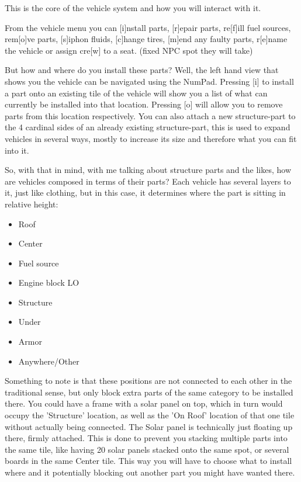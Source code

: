 This is the core of the vehicle system and how you will interact with it.

From the vehicle menu you can [i]nstall parts, [r]epair parts, re[f]ill fuel sources, rem[o]ve parts, [s]iphon fluids, [c]hange tires, [m]end any faulty parts, r[e]name the vehicle or assign cre[w] to a seat. (fixed NPC spot they will take)

But how and where do you install these parts? Well, the left hand view that shows you the vehicle can be navigated using the NumPad. Pressing [i] to install a part onto an existing tile of the vehicle will show you a list of what can currently be installed into that location. Pressing [o] will allow you to remove parts from this location respectively. You can also attach a new structure-part to the 4 cardinal sides of an already existing structure-part, this is used to expand vehicles in several ways, mostly to increase its size and therefore what you can fit into it.

So, with that in mind, with me talking about structure parts and the likes, how are vehicles composed in terms of their parts? Each vehicle has several layers to it, just like clothing, but in this case, it determines where the part is sitting in relative height:

\begin{itemize}
\item Roof
\item Center
\item Fuel source
\item Engine block LO
\item Structure
\item Under
\item Armor
\item Anywhere/Other
\end{itemize}

Something to note is that these positions are not connected to each other in the traditional sense, but only block extra parts of the same category to be installed there. You could have a frame with a solar panel on top, which in turn would occupy the 'Structure' location, as well as the 'On Roof' location of that one tile without actually being connected. The Solar panel is technically just floating up there, firmly attached. This is done to prevent you stacking multiple parts into the same tile, like having 20 solar panels stacked onto the same spot, or several boards in the same Center tile. This way you will have to choose what to install where and it potentially blocking out another part you might have wanted there.

